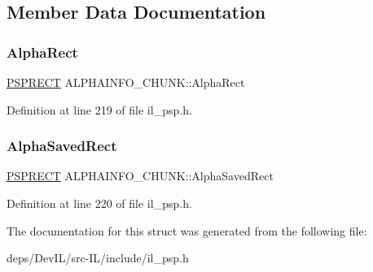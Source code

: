 \subsection{Member Data Documentation}
\mbox{\label{structALPHAINFO__CHUNK_a41990cad701947480d6af905ef5a0935}} 
\subsubsection{\texorpdfstring{Alpha\+Rect}{AlphaRect}}
{\footnotesize\ttfamily \hyperlink{structPSPRECT}{P\+S\+P\+R\+E\+CT} A\+L\+P\+H\+A\+I\+N\+F\+O\+\_\+\+C\+H\+U\+N\+K\+::\+Alpha\+Rect}



Definition at line 219 of file il\+\_\+psp.\+h.

\mbox{\label{structALPHAINFO__CHUNK_a4888fe60356b4797503a2cfb791988b4}} 
\subsubsection{\texorpdfstring{Alpha\+Saved\+Rect}{AlphaSavedRect}}
{\footnotesize\ttfamily \hyperlink{structPSPRECT}{P\+S\+P\+R\+E\+CT} A\+L\+P\+H\+A\+I\+N\+F\+O\+\_\+\+C\+H\+U\+N\+K\+::\+Alpha\+Saved\+Rect}



Definition at line 220 of file il\+\_\+psp.\+h.



The documentation for this struct was generated from the following file\+:\begin{DoxyCompactItemize}
\item 
deps/\+Dev\+I\+L/src-\/\+I\+L/include/il\+\_\+psp.\+h\end{DoxyCompactItemize}
